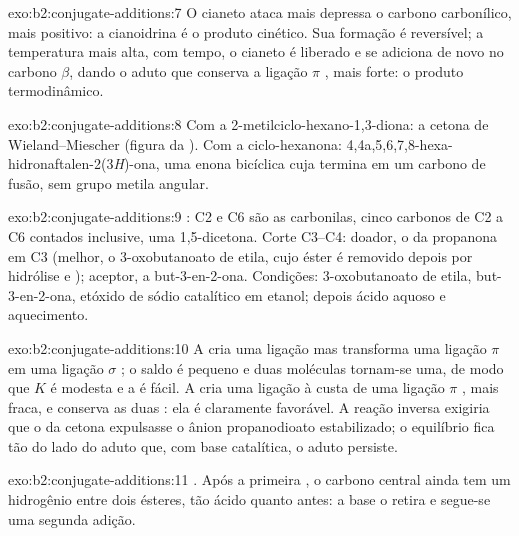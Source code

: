\begin{solution}{exo:b2:conjugate-additions:7}
O cianeto ataca mais depressa o carbono carbonílico, mais positivo: a cianoidrina é o produto cinético.
Sua formação é reversível; a temperatura mais alta, com tempo, o cianeto é liberado e se adiciona de
novo no carbono $\beta$, dando o aduto que conserva a ligação $\pi$ , mais forte: o produto
termodinâmico.
\end{solution}

\begin{solution}{exo:b2:conjugate-additions:8}
Com a 2-metilciclo-hexano-1,3-diona: a cetona de Wieland--Miescher (figura da ).
Com a ciclo-hexanona: 4,4a,5,6,7,8-hexa-hidronaftalen-2(3\textit{H})-ona, uma enona bicíclica cuja
 termina em um carbono de fusão, sem grupo metila angular.
\end{solution}

\begin{solution}{exo:b2:conjugate-additions:9}
: C2 e C6 são as carbonilas, cinco carbonos de C2 a C6 contados inclusive,
uma 1,5-dicetona. Corte C3--C4: doador, o  da propanona em C3 (melhor, o 3-oxobutanoato de etila,
cujo éster é removido depois por hidrólise e ); aceptor, a but-3-en-2-ona. Condições:
3-oxobutanoato de etila, but-3-en-2-ona, etóxido de sódio catalítico em etanol; depois ácido aquoso e
aquecimento.
\end{solution}

\begin{solution}{exo:b2:conjugate-additions:10}
A  cria uma ligação  mas transforma uma ligação $\pi$  em uma ligação $\sigma$
; o saldo é pequeno e duas moléculas tornam-se uma, de modo que $K$ é modesta e a 
é fácil. A  cria uma ligação  à custa de uma ligação $\pi$ , mais fraca,
e conserva as duas : ela é claramente favorável. A reação inversa exigiria que o  da cetona expulsasse o ânion propanodioato estabilizado; o
equilíbrio fica tão do lado do aduto que, com base catalítica, o aduto persiste.
\end{solution}

\begin{solution}{exo:b2:conjugate-additions:11}
. Após a primeira , o carbono central ainda tem um
hidrogênio entre dois ésteres, tão ácido quanto antes: a base o retira e segue-se uma segunda adição.
\end{solution}

